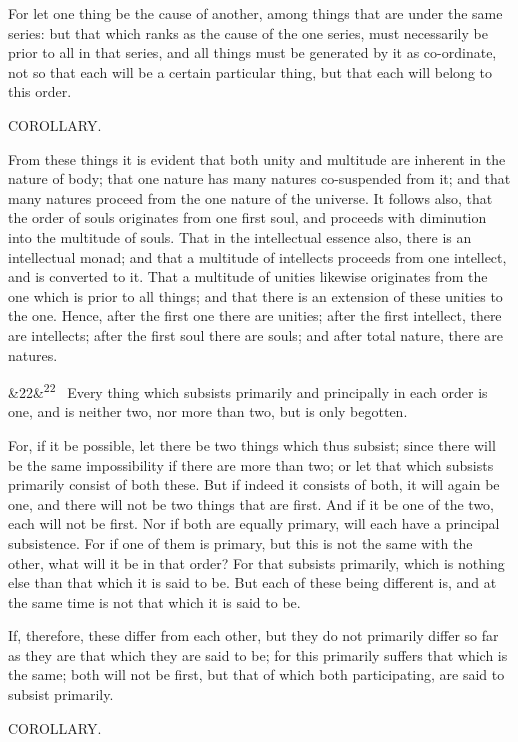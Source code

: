 \documentclass[12pt]{article}
\newcommand{\para}[1][]{\par\noindent\ifx&#1&\else\textsuperscript{\footnotesize #1}~\fi}
\begin{document}
For let one thing be the cause of another, among things that are under the same series: but that which ranks as the cause of the one series, must necessarily be prior to all in that series, and all things must be generated by it as co-ordinate, not so that each will be a certain particular thing, but that each will belong to this order.

COROLLARY.

From these things it is evident that both unity and multitude are inherent in the nature of body; that one nature has many natures co-suspended from it; and that many natures proceed from the one nature of the universe. It follows also, that the order of souls originates from one first soul, and proceeds with diminution into the multitude of souls. That in the intellectual essence also, there is an intellectual monad; and that a multitude of intellects proceeds from one intellect, and is converted to it. That a multitude of unities likewise originates from the one which is prior to all things; and that there is an extension of these unities to the one. Hence, after the first one there are unities; after the first intellect, there are intellects; after the first soul there are souls; and after total nature, there are natures.

\para[22] Every thing which subsists primarily and principally in each order is one, and is neither two, nor more than two, but is only begotten.

For, if it be possible, let there be two things which thus subsist; since there will be the same impossibility if there are more than two; or let that which subsists primarily consist of both these. But if indeed it consists of both, it will again be one, and there will not be two things that are first. And if it be one of the two, each will not be first. Nor if both are equally primary, will each have a principal subsistence. For if one of them is primary, but this is not the same with the other, what will it be in that order? For that subsists primarily, which is nothing else than that which it is said to be. But each of these being different is, and at the same time is not that which it is said to be.

If, therefore, these differ from each other, but they do not primarily differ so far as they are that which they are said to be; for this primarily suffers that which is the same; both will not be first, but that of which both participating, are said to subsist primarily.

COROLLARY.
\end{document}
